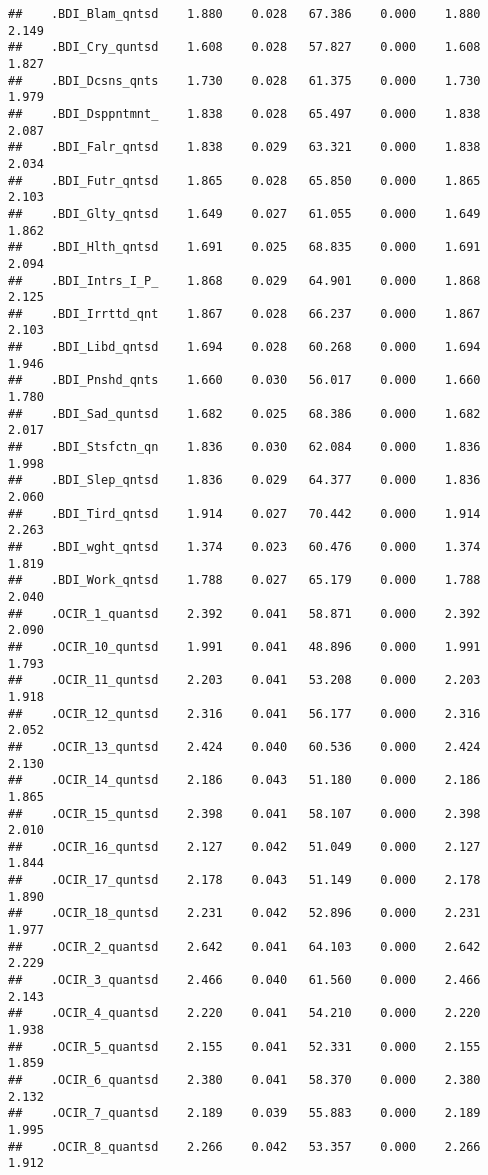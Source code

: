 \documentclass[]{article}
\begin{document}
\begin{verbatim}
##    .BDI_Blam_qntsd    1.880    0.028   67.386    0.000    1.880    2.149
##    .BDI_Cry_quntsd    1.608    0.028   57.827    0.000    1.608    1.827
##    .BDI_Dcsns_qnts    1.730    0.028   61.375    0.000    1.730    1.979
##    .BDI_Dsppntmnt_    1.838    0.028   65.497    0.000    1.838    2.087
##    .BDI_Falr_qntsd    1.838    0.029   63.321    0.000    1.838    2.034
##    .BDI_Futr_qntsd    1.865    0.028   65.850    0.000    1.865    2.103
##    .BDI_Glty_qntsd    1.649    0.027   61.055    0.000    1.649    1.862
##    .BDI_Hlth_qntsd    1.691    0.025   68.835    0.000    1.691    2.094
##    .BDI_Intrs_I_P_    1.868    0.029   64.901    0.000    1.868    2.125
##    .BDI_Irrttd_qnt    1.867    0.028   66.237    0.000    1.867    2.103
##    .BDI_Libd_qntsd    1.694    0.028   60.268    0.000    1.694    1.946
##    .BDI_Pnshd_qnts    1.660    0.030   56.017    0.000    1.660    1.780
##    .BDI_Sad_quntsd    1.682    0.025   68.386    0.000    1.682    2.017
##    .BDI_Stsfctn_qn    1.836    0.030   62.084    0.000    1.836    1.998
##    .BDI_Slep_qntsd    1.836    0.029   64.377    0.000    1.836    2.060
##    .BDI_Tird_qntsd    1.914    0.027   70.442    0.000    1.914    2.263
##    .BDI_wght_qntsd    1.374    0.023   60.476    0.000    1.374    1.819
##    .BDI_Work_qntsd    1.788    0.027   65.179    0.000    1.788    2.040
##    .OCIR_1_quantsd    2.392    0.041   58.871    0.000    2.392    2.090
##    .OCIR_10_quntsd    1.991    0.041   48.896    0.000    1.991    1.793
##    .OCIR_11_quntsd    2.203    0.041   53.208    0.000    2.203    1.918
##    .OCIR_12_quntsd    2.316    0.041   56.177    0.000    2.316    2.052
##    .OCIR_13_quntsd    2.424    0.040   60.536    0.000    2.424    2.130
##    .OCIR_14_quntsd    2.186    0.043   51.180    0.000    2.186    1.865
##    .OCIR_15_quntsd    2.398    0.041   58.107    0.000    2.398    2.010
##    .OCIR_16_quntsd    2.127    0.042   51.049    0.000    2.127    1.844
##    .OCIR_17_quntsd    2.178    0.043   51.149    0.000    2.178    1.890
##    .OCIR_18_quntsd    2.231    0.042   52.896    0.000    2.231    1.977
##    .OCIR_2_quantsd    2.642    0.041   64.103    0.000    2.642    2.229
##    .OCIR_3_quantsd    2.466    0.040   61.560    0.000    2.466    2.143
##    .OCIR_4_quantsd    2.220    0.041   54.210    0.000    2.220    1.938
##    .OCIR_5_quantsd    2.155    0.041   52.331    0.000    2.155    1.859
##    .OCIR_6_quantsd    2.380    0.041   58.370    0.000    2.380    2.132
##    .OCIR_7_quantsd    2.189    0.039   55.883    0.000    2.189    1.995
##    .OCIR_8_quantsd    2.266    0.042   53.357    0.000    2.266    1.912

\end{verbatim}
\end{document}
